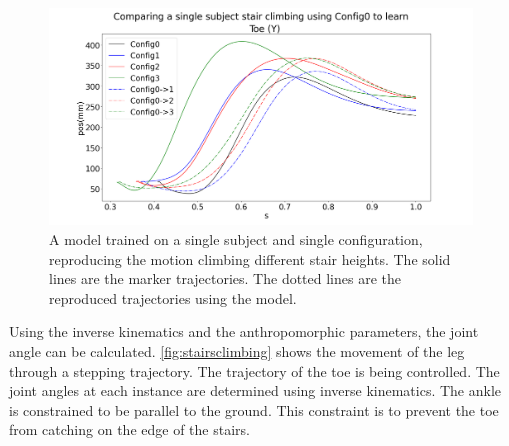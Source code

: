 \begin{figure}
    \centering
    \includegraphics[scale=0.20]{images/compareHeihgts.png}
    \caption{A model trained on a single subject and single configuration, reproducing the motion climbing different stair heights. The solid lines are the marker trajectories. The dotted lines are the reproduced trajectories using the model.}
    \label{fig:singleSubject}
\end{figure}


Using the inverse kinematics and the anthropomorphic parameters, the joint angle can be calculated. \autoref{fig:stairsclimbing} shows the movement of the leg through a stepping trajectory. The trajectory of the toe is being controlled. The joint angles at each instance are determined using inverse kinematics. The ankle is constrained to be parallel to the ground. This constraint is to prevent the toe from catching on the edge of the stairs.



